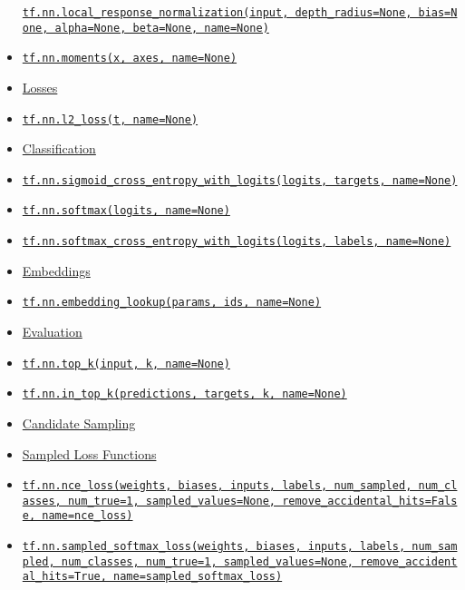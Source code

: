 \begin{itemize}
  \protect\hyperlink{localux5fresponseux5fnormalization}{\texttt{tf.nn.local\_response\_normalization(input,\ depth\_radius=None,\ bias=None,\ alpha=None,\ beta=None,\ name=None)}}
\item
  \protect\hyperlink{moments}{\texttt{tf.nn.moments(x,\ axes,\ name=None)}}
\item
  \protect\hyperlink{AUTOGENERATED-losses}{Losses}
\item
  \protect\hyperlink{l2ux5floss}{\texttt{tf.nn.l2\_loss(t,\ name=None)}}
\item
  \protect\hyperlink{AUTOGENERATED-classification}{Classification}
\item
  \protect\hyperlink{sigmoidux5fcrossux5fentropyux5fwithux5flogits}{\texttt{tf.nn.sigmoid\_cross\_entropy\_with\_logits(logits,\ targets,\ name=None)}}
\item
  \protect\hyperlink{softmax}{\texttt{tf.nn.softmax(logits,\ name=None)}}
\item
  \protect\hyperlink{softmaxux5fcrossux5fentropyux5fwithux5flogits}{\texttt{tf.nn.softmax\_cross\_entropy\_with\_logits(logits,\ labels,\ name=None)}}
\item
  \protect\hyperlink{AUTOGENERATED-embeddings}{Embeddings}
\item
  \protect\hyperlink{embeddingux5flookup}{\texttt{tf.nn.embedding\_lookup(params,\ ids,\ name=None)}}
\item
  \protect\hyperlink{AUTOGENERATED-evaluation}{Evaluation}
\item
  \protect\hyperlink{topux5fk}{\texttt{tf.nn.top\_k(input,\ k,\ name=None)}}
\item
  \protect\hyperlink{inux5ftopux5fk}{\texttt{tf.nn.in\_top\_k(predictions,\ targets,\ k,\ name=None)}}
\item
  \protect\hyperlink{AUTOGENERATED-candidate-sampling}{Candidate
  Sampling}
\item
  \protect\hyperlink{AUTOGENERATED-sampled-loss-functions}{Sampled Loss
  Functions}
\item
  \protect\hyperlink{nceux5floss}{\texttt{tf.nn.nce\_loss(weights,\ biases,\ inputs,\ labels,\ num\_sampled,\ num\_classes,\ num\_true=1,\ sampled\_values=None,\ remove\_accidental\_hits=False,\ name=\textquotesingle{}nce\_loss\textquotesingle{})}}
\item
  \protect\hyperlink{sampledux5fsoftmaxux5floss}{\texttt{tf.nn.sampled\_softmax\_loss(weights,\ biases,\ inputs,\ labels,\ num\_sampled,\ num\_classes,\ num\_true=1,\ sampled\_values=None,\ remove\_accidental\_hits=True,\ name=\textquotesingle{}sampled\_softmax\_loss\textquotesingle{})}}

\end{itemize}

